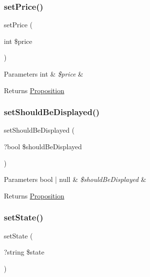 \subsubsection{\texorpdfstring{setPrice()}{setPrice()}}
{\footnotesize\ttfamily set\+Price (\begin{DoxyParamCaption}\item[{int}]{\$price }\end{DoxyParamCaption})}


\begin{DoxyParams}[1]{Parameters}
int & {\em \$price} & \\
\hline
\end{DoxyParams}
\begin{DoxyReturn}{Returns}
\mbox{\hyperlink{class_app_1_1_entity_1_1_proposition}{Proposition}} 
\end{DoxyReturn}
\mbox{\label{class_app_1_1_entity_1_1_proposition_a322db8bcef4e74e4f9b4ef1b87686446}} 
\subsubsection{\texorpdfstring{setShouldBeDisplayed()}{setShouldBeDisplayed()}}
{\footnotesize\ttfamily set\+Should\+Be\+Displayed (\begin{DoxyParamCaption}\item[{?bool}]{\$should\+Be\+Displayed }\end{DoxyParamCaption})}


\begin{DoxyParams}[1]{Parameters}
bool | null & {\em \$should\+Be\+Displayed} & \\
\hline
\end{DoxyParams}
\begin{DoxyReturn}{Returns}
\mbox{\hyperlink{class_app_1_1_entity_1_1_proposition}{Proposition}} 
\end{DoxyReturn}
\mbox{\label{class_app_1_1_entity_1_1_proposition_ad77046fc7af023c04e134c61acbeea3d}} 
\subsubsection{\texorpdfstring{setState()}{setState()}}
{\footnotesize\ttfamily set\+State (\begin{DoxyParamCaption}\item[{?string}]{\$state }\end{DoxyParamCaption})}


